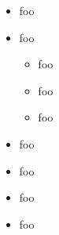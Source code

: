 \documentclass[UTF8,hyperref]{ctexart}
\begin{document}
\begin{itemize}[nosep,leftmargin=*]
\item foo
\item foo
\begin{itemize}[nosep,leftmargin=*]
\item foo
\item foo
\item foo
\end{itemize}
\item foo
\item foo
\item foo
\item foo
\end{itemize}
\end{document}
